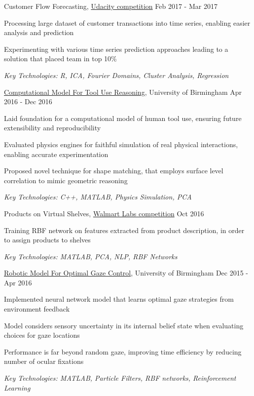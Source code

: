\documentclass[11pt,article,oneside]{memoir}
\newenvironment{itemize*}{%
  \renewcommand\labelitemi{\textbullet}
  \footnotesize
  \begin{itemize}%
    \setlength{\itemsep}{0pt}}%
  {\end{itemize}
}
\begin{document}
\normalsize
\medskip
\ind Customer Flow Forecasting, \href{https://blog.udacity.com/2017/01/data-science-enthusiasts-win-10000.html}{Udacity competition} \hfill Feb 2017 - Mar 2017
\begin{itemize*}
  \item Processing large dataset of customer transactions into time series, enabling easier analysis and prediction  
  \item Experimenting with various time series prediction approaches leading to a solution that placed team in top 10\%
\end{itemize*}
\ind \hspace{0.35in} \footnotesize \emph{Key Technologies: R, ICA, Fourier Domains, Cluster Analysis, Regression}

\normalsize
\medskip
\ind \href{https://github.com/iceiony/4ConstraintsTheory/}{Computational Model For Tool Use Reasoning}, University of Birmingham \hfill Apr 2016 - Dec 2016
\begin{itemize*}
  \item Laid foundation for a computational model of human tool use, ensuring future extensibility and reproducibility 
  \item Evaluated physics engines for faithful simulation of real physical interactions, enabling accurate experimentation 
  \item Proposed novel technique for shape matching, that employs surface level correlation to mimic geometric reasoning
\end{itemize*}
\ind \hspace{0.35in} \footnotesize \emph{Key Technologies: C++, MATLAB, Physics Simulation, PCA}

\normalsize
\medskip
\ind Products on Virtual Shelves, \href{https://www.hackerrank.com/walmart-codesprint-ml}{Walmart Labs competition} \hfill Oct 2016
\begin{itemize*}
  \item Training RBF network on features extracted from product description, in order to assign products to shelves
\end{itemize*}
\ind \hspace{0.35in} \footnotesize \emph{Key Technologies: MATLAB, PCA, NLP, RBF Networks}

\normalsize
\medskip
\ind \href{https://github.com/iceiony/gaze-control/}{Robotic Model For Optimal Gaze Control}, University of Birmingham \hfill Dec 2015 - Apr 2016
\begin{itemize*}
  \item Implemented neural network model that learns optimal gaze strategies from environment feedback
  \item Model considers sensory uncertainty in its internal belief state when evaluating choices for gaze locations
  \item Performance is far beyond random gaze, improving time efficiency by reducing number of ocular fixations 
\end{itemize*}
\ind \hspace{0.35in} \footnotesize \emph{Key Technologies: MATLAB, Particle Filters, RBF networks, Reinforcement Learning}
\end{document}
